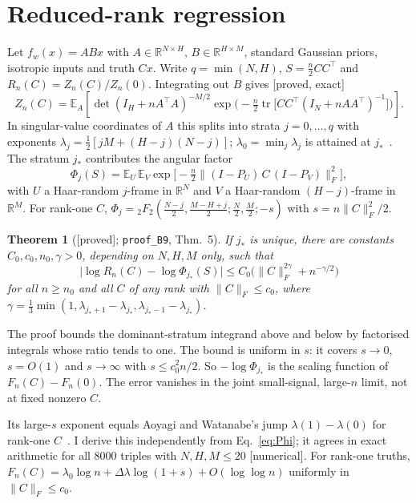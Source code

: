 \documentclass[11pt]{article}
\newcommand{\R}{\mathbb{R}}
\newcommand{\E}{\mathbb{E}}
\newcommand{\hypF}[2]{{}_{#1}F_{#2}}
\newcommand{\file}[1]{\nolinkurl{#1}}
\newcommand{\status}[1]{\textsf{[#1]}}
\newtheorem{theorem}{Theorem}
\begin{document}
\section{Reduced-rank regression}

Let $f_w(x)=ABx$ with $A\in\R^{N\times H}$, $B\in\R^{H\times M}$, standard Gaussian priors, isotropic inputs and truth $Cx$.
Write $q=\min(N,H)$, $S=\tfrac n2CC^\top$ and $R_n(C)=Z_n(C)/Z_n(0)$.
Integrating out $B$ gives \status{proved, exact}
\begin{equation}
  Z_n(C)=\E_A\!\left[\det(I_H+nA^\top A)^{-M/2}\exp\!\Big(-\tfrac n2\operatorname{tr}\big[CC^\top(I_N+nAA^\top)^{-1}\big]\Big)\right].
  \label{eq:reduction}
\end{equation}
In singular-value coordinates of $A$ this splits into strata $j=0,\dots,q$ with exponents $\lambda_j=\tfrac12[jM+(H-j)(N-j)]$; $\lambda_0=\min_j\lambda_j$ is attained at $j_*$~\cite{AW05}.
The stratum $j_*$ contributes the angular factor
\begin{equation}
  \Phi_{j}(S)=\E_{U}\,\E_{V}\exp\!\big[-\tfrac n2\lVert(I-P_U)\,C\,(I-P_V)\rVert_F^2\big],
  \label{eq:Phi}
\end{equation}
with $U$ a Haar-random $j$-frame in $\R^N$ and $V$ a Haar-random $(H-j)$-frame in $\R^M$.
For rank-one $C$, $\Phi_j=\hypF22(\tfrac{N-j}2,\tfrac{M-H+j}2;\tfrac N2,\tfrac M2;-s)$ with $s=n\lVert C\rVert_F^2/2$.

\begin{theorem}[\status{proved}; \file{proof_B9}, Thm.~5]
If $j_*$ is unique, there are constants $C_0,c_0,n_0,\gamma>0$, depending on $N,H,M$ only, such that
\begin{equation}
  \big\lvert\log R_n(C)-\log\Phi_{j_*}(S)\big\rvert\le C_0\big(\lVert C\rVert_F^{2\gamma}+n^{-\gamma/2}\big)
  \label{eq:thm}
\end{equation}
for all $n\ge n_0$ and all $C$ of any rank with $\lVert C\rVert_F\le c_0$, where $\gamma=\tfrac13\min(1,\lambda_{j_*+1}-\lambda_{j_*},\lambda_{j_*-1}-\lambda_{j_*})$.
\end{theorem}

The proof bounds the dominant-stratum integrand above and below by factorised integrals whose ratio tends to one.
The bound is uniform in $s$: it covers $s\to0$, $s=O(1)$ and $s\to\infty$ with $s\le c_0^2n/2$.
So $-\log\Phi_{j_*}$ is the scaling function of $F_n(C)-F_n(0)$.
The error vanishes in the joint small-signal, large-$n$ limit, not at fixed nonzero $C$.

Its large-$s$ exponent equals Aoyagi and Watanabe's jump $\lambda(1)-\lambda(0)$ for rank-one $C$~\cite{AW05}.
I derive this independently from Eq.~\eqref{eq:Phi}; it agrees in exact arithmetic for all $8000$ triples with $N,H,M\le20$ \status{numerical}.
For rank-one truths, $F_n(C)=\lambda_0\log n+\Delta\lambda\log(1+s)+O(\log\log n)$ uniformly in $\lVert C\rVert_F\le c_0$.
\end{document}
